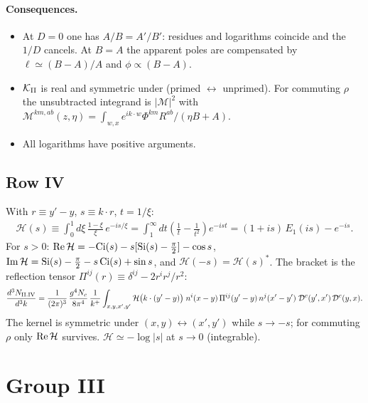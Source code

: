 \documentclass[10pt]{article}
\numberwithin{equation}{section}
\begin{document}
\paragraph{Consequences.}
\begin{itemize}
\item At $D=0$ one has $A/B=A'/B'$: residues and logarithms coincide and the $1/D$ cancels. At $B=A$ the apparent poles are compensated by $\ell\simeq(B-A)/A$ and $\phi\propto(B-A)$.
\item $\mathcal{K}_{\rm II}$ is real and symmetric under (primed $\leftrightarrow$ unprimed). For commuting $\rho$ the unsubtracted integrand is $|\mathcal{M}|^{2}$ with $\mathcal{M}^{km,ab}(z,\eta)=\int_{w,x}e^{ik\cdot w}\Phi^{km}R^{ab}/(\eta B+A)$.
\item All logarithms have positive arguments.
\end{itemize}

\subsection{Row IV}
With $r\equiv y'-y$, $s\equiv k\cdot r$, $t=1/\xi$:
\begin{align}
\mathcal{H}(s)\equiv\int_{0}^{1}d\xi\,\frac{1-\xi}{\xi}\,e^{-is/\xi}=\int_{1}^{\infty}dt\left(\frac1t-\frac{1}{t^{2}}\right)e^{-ist}=(1+is)\,E_{1}(is)-e^{-is}.
\end{align}
For $s>0$: ${\rm Re}\,\mathcal{H}=-{\rm Ci}(s)-s[{\rm Si}(s)-\tfrac{\pi}{2}]-\cos s$, ${\rm Im}\,\mathcal{H}={\rm Si}(s)-\tfrac{\pi}{2}-s\,{\rm Ci}(s)+\sin s$, and $\mathcal{H}(-s)=\mathcal{H}(s)^{*}$. The bracket is the reflection tensor $\Pi^{ij}(r)\equiv\delta^{ij}-2r^{i}r^{j}/r^{2}$:
\begin{align}
\frac{d^{3}N_{\rm II.IV}}{d^{3}k}=\frac{1}{(2\pi)^{3}}\,\frac{g^{4}N_{c}}{8\pi^{4}}\,\frac{1}{k^{+}}\int_{x,y,x',y'}\mathcal{H}\big(k\cdot(y'-y)\big)\;n^{i}(x-y)\,\Pi^{ij}(y'-y)\,n^{j}(x'-y')\;
\mathcal{D}^{c}(y',x')\,\mathcal{D}^{c}(y,x). \label{eq:GIIIV}
\end{align}
The kernel is symmetric under $(x,y)\leftrightarrow(x',y')$ while $s\to-s$; for commuting $\rho$ only ${\rm Re}\,\mathcal{H}$ survives. $\mathcal{H}\simeq-\log|s|$ at $s\to0$ (integrable).

\section{Group III}
\end{document}
